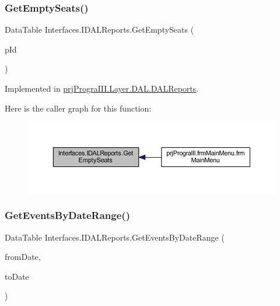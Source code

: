 \subsubsection{\texorpdfstring{Get\+Empty\+Seats()}{GetEmptySeats()}}
{\footnotesize\ttfamily Data\+Table Interfaces.\+I\+D\+A\+L\+Reports.\+Get\+Empty\+Seats (\begin{DoxyParamCaption}\item[{int}]{p\+Id }\end{DoxyParamCaption})}



Implemented in \hyperlink{classprj_progra_i_i_i_1_1_layer_1_1_d_a_l_1_1_d_a_l_reports_aac3d2267dc8f67b5b83d3df0c6ce1991}{prj\+Progra\+I\+I\+I.\+Layer.\+D\+A\+L.\+D\+A\+L\+Reports}.

Here is the caller graph for this function\+:
\nopagebreak
\begin{figure}[H]
\begin{center}
\leavevmode
\includegraphics[width=350pt]{interface_interfaces_1_1_i_d_a_l_reports_aae14fd24724e5b09d6c577805b79262a_icgraph}
\end{center}
\end{figure}
\hypertarget{interface_interfaces_1_1_i_d_a_l_reports_a7cd9a35b355b8b8ae6dfc43b715758af}{}\label{interface_interfaces_1_1_i_d_a_l_reports_a7cd9a35b355b8b8ae6dfc43b715758af} 
\subsubsection{\texorpdfstring{Get\+Events\+By\+Date\+Range()}{GetEventsByDateRange()}}
{\footnotesize\ttfamily Data\+Table Interfaces.\+I\+D\+A\+L\+Reports.\+Get\+Events\+By\+Date\+Range (\begin{DoxyParamCaption}\item[{Date\+Time}]{from\+Date,  }\item[{Date\+Time}]{to\+Date }\end{DoxyParamCaption})}



